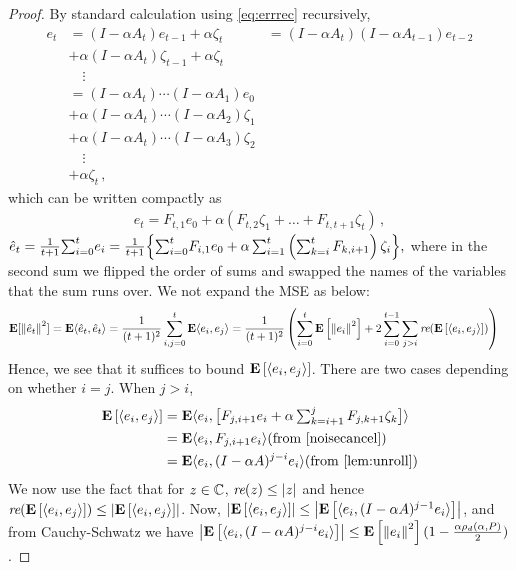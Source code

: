 \begin{proof}
By standard calculation using \eqref{eq:errrec} recursively, 
\begin{align*}
e_t&=(I-\alpha A_t)e_{t-1}+\alpha \zeta_t
& = (I-\alpha A_t) (I-\alpha A_{t-1}) e_{t-2}\\ &+ \alpha (I-\alpha A_t) \zeta_{t-1} +\alpha \zeta_t \\
& \quad \vdots\\
& = (I-\alpha A_t) \cdots (I-\alpha A_1) e_0\\ &+ \alpha (I-\alpha A_t) \cdots (I-\alpha A_2) \zeta_1 \\
& + \alpha (I-\alpha A_t) \cdots (I-\alpha A_3) \zeta_2\\
&  \quad \vdots \\
&+ \alpha \zeta_t\,,
\end{align*}
which can be written compactly as
\begin{align}
\label{eq:etft}
e_t = F_{t,1} e_0 + \alpha (F_{t,2} \zeta_1 + \dots + F_{t,t+1} \zeta_t )\,,
\end{align}
$\hat{e}_t=\frac{1}{t+1}{\sum}_{i=0}^{t}e_i =\frac{1}{t+1}\Big\{{\sum}_{i=0}^{t} F_{i,1} e_0 + \alpha \sum_{i=1}^{t} \left(\sum_{k=i}^{t} F_{k,i+1} \right)\zeta_i \Big\} ,$
where in the second sum we flipped the order of sums and swapped the names of the variables that the sum runs over.
We not expand the MSE as below:
\begin{align*}
\mathbf{E}[\left\| \hat{e}_t\right\|^2]&=\mathbf{E}\langle\hat{e}_t,\hat{e}_t\rangle=\frac{1}{(t+1)^2} \sum_{i,j=0}^t \mathbf{E}\langle e_i,e_j\rangle= \frac{1}{(t+1)^2}\left(\sum_{i=0}^t \mathbf{E}\left[\left\| e_i\right\|^2\right]+2\sum_{i=0}^{t-1}\sum_{j>i} \emph{re}(\mathbf{E}\left[\langle e_i,e_j\rangle\right])\right)
\end{align*}
Hence, we see that it suffices to bound $\mathbf{E}\left[\langle e_i,  e_j \rangle\right]$.
There are two cases depending on whether $i=j$. When $j> i$,
\begin{align*}
\EE{\ip{e_i,e_j}}
&=\E \ip{e_i,\big[F_{j,i+1} e_i+\alpha\textstyle\sum_{k=i+1}^j F_{j,k+1}\zeta_{k}\big]}\\
&=\E\ip{e_i,F_{j,i+1} e_i}  \text{(from \Cref{noisecancel})}\\
&=\E\ip{e_i, (I-\alpha A)^{j-i} e_i} \text{(from \Cref{lem:unroll})}
\end{align*}
We now use the fact that for $z\in \mathbb{C}$, $\emph{re}(z)\leq \left|z\right|$ and hence $\emph{re}(\mathbf{E}\left[\langle e_i,e_j\rangle\right])\leq \left|\mathbf{E}\left[\langle e_i,e_j\rangle\right]\right|$. Now,  $\left|\mathbf{E}\left[\langle e_i,e_j\rangle\right]\right|\leq \left|\mathbf{E}\left[\langle e_i,(I-\alpha A)^{j-1}e_i\rangle\right]\right|$, and from Cauchy-Schwatz we have $\left|\mathbf{E}\left[\langle e_i, (I-\alpha A)^{j-i}e_i\rangle\right]\right|\leq \mathbf{E}\left[\left\| e_i\right\|^2\right](1-\frac{\alpha\rho_d(\alpha,P)}{2})$.

\end{proof}
